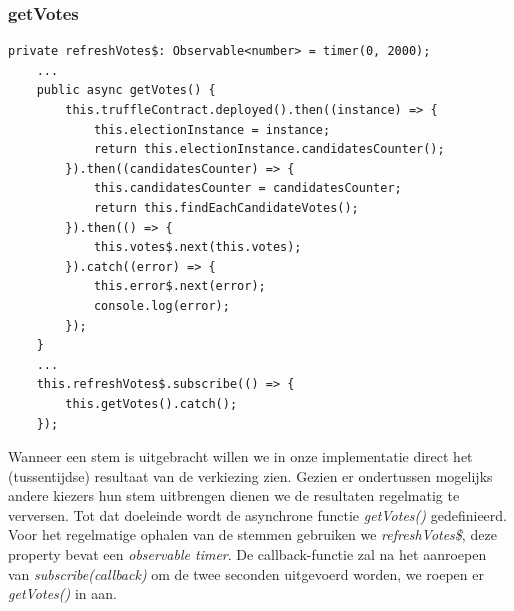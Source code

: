 	\subsubsection{getVotes}
	\lstset{language=JavaScriptSolidity} 
	\begin{lstlisting}[numbers=none]
	private refreshVotes$: Observable<number> = timer(0, 2000);
	...
	public async getVotes() {
		this.truffleContract.deployed().then((instance) => {
			this.electionInstance = instance;
			return this.electionInstance.candidatesCounter();
		}).then((candidatesCounter) => {
			this.candidatesCounter = candidatesCounter;
			return this.findEachCandidateVotes();
		}).then(() => {
			this.votes$.next(this.votes);
		}).catch((error) => {
			this.error$.next(error);
			console.log(error);
		});
	}
	...
	this.refreshVotes$.subscribe(() => {
		this.getVotes().catch();
	});
	\end{lstlisting}
	Wanneer een stem is uitgebracht willen we in onze implementatie direct het (tussentijdse) resultaat van de verkiezing zien. Gezien er ondertussen mogelijks andere kiezers hun stem uitbrengen dienen we de resultaten regelmatig te verversen. Tot dat doeleinde wordt de asynchrone functie \textit{getVotes()} gedefinieerd. Voor het regelmatige ophalen van de stemmen gebruiken we \textit{refreshVotes\$}, deze property bevat een \textit{observable timer}. De callback-functie zal na het aanroepen van \textit{subscribe(callback)} om de twee seconden uitgevoerd worden, we roepen er  \textit{getVotes()} in aan.
